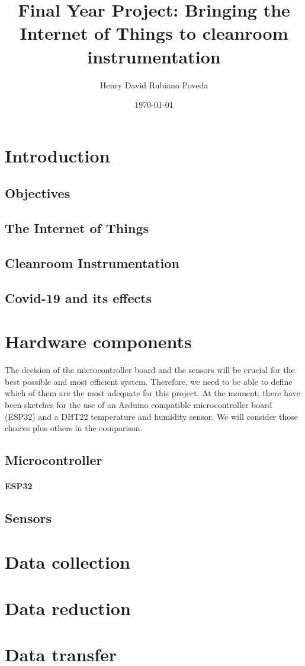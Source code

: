 \documentclass{article}
\title{Final Year Project: Bringing the Internet of Things to cleanroom instrumentation}
\author{Henry David Rubiano Poveda}
\date{\today}
\begin{document}
\maketitle
\newpage

\tableofcontents

\section{Introduction}
\subsection{Objectives}
\subsection{The Internet of Things}
\subsection{Cleanroom Instrumentation}
\subsection{Covid-19 and its effects}

\section{Hardware components}

The decision of the microcontroller board and the sensors will be crucial for the best possible and most efficient system. Therefore, we need to be able to define which of them are the most adequate for this project.\newline
At the moment, there have been sketches for the use of an Arduino compatible microcontroller board (ESP32) and a DHT22 temperature and humidity sensor. We will consider those choices plus others in the comparison.

\subsection{Microcontroller}


\paragraph*{ESP32}
\subsection{Sensors}

\section{Data collection}

\section{Data reduction}

\section{Data transfer}
\end{document}
